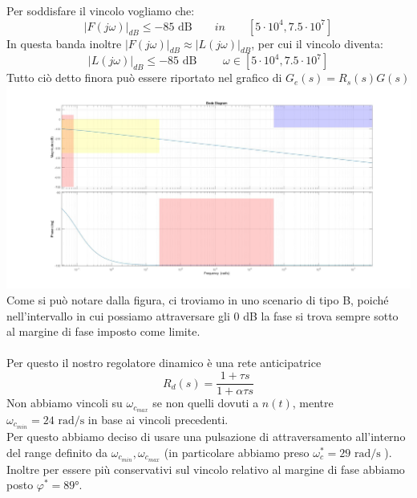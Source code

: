     Per soddisfare il vincolo vogliamo che:
    \begin{equation*}
        \lvert F(j\omega) \lvert_{dB} \le -85 \textrm{ dB} \qquad in \qquad [5\cdot 10^4, 7.5\cdot 10^7]
    \end{equation*}
    In questa banda inoltre $ \lvert F(j\omega) \lvert_{dB} \approx \lvert L(j\omega) \lvert_{dB} $, per cui il 
    vincolo diventa:
    \begin{equation*}
        \lvert L(j\omega) \lvert_{dB} \le -85 \textrm{ dB } \qquad \omega \in [5\cdot 10^4, 7.5\cdot 10^7]
    \end{equation*}
    \clearpage
    Tutto ciò detto finora può essere riportato nel grafico di $G_e(s)=R_s(s)G(s)$\\
    \includegraphics[scale=0.25]{./immagini/bode_ge.jpg}
    \\
    Come si può notare dalla figura, ci troviamo in uno scenario di tipo B, poiché nell'intervallo 
    in cui possiamo attraversare gli 0 dB la fase si trova sempre sotto al margine di fase imposto come limite.
    \\\\
    Per questo il nostro regolatore dinamico è una rete anticipatrice
    \begin{equation*}
        R_d(s)=\dfrac{1+\tau s}{1+\alpha \tau s}
    \end{equation*}
    Non abbiamo vincoli su $\omega_{c_{max}}$ se non quelli dovuti a $n(t)$, mentre 
    $\omega_{c_{min}}=24 \textrm{ rad/s}$ in base ai vincoli precedenti.
    \\
    Per questo abbiamo deciso di usare una pulsazione di attraversamento all'interno del 
    range definito da $\omega_{c_{min}}, \omega_{c_{max}}$ (in particolare abbiamo preso 
    $\omega_c^*=29 \textrm{ rad/s}$ ). Inoltre per essere più conservativi sul vincolo 
    relativo al margine di fase abbiamo posto $\varphi^*=\ang{89}$.
